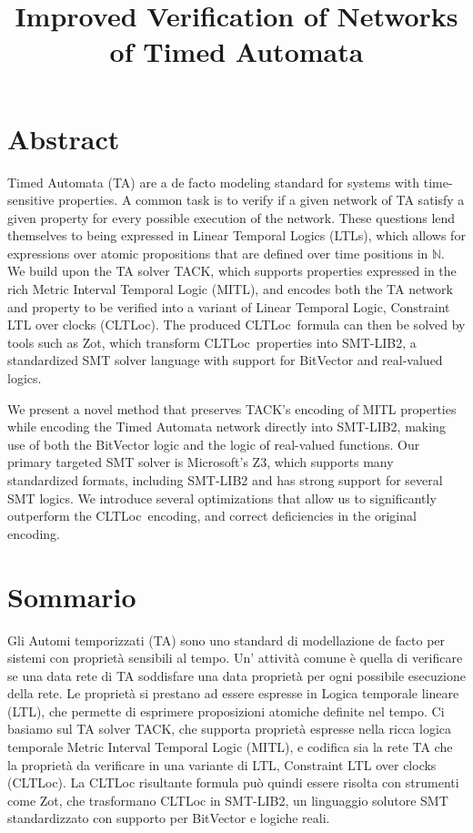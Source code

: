 \documentclass[a4paper,11pt]{report}
\theoremstyle{definition}
\newcommand{\cltloc}{CLTLoc}
\begin{document}
\title{Improved Verification of Networks of Timed Automata}
  

\tableofcontents
\listoffigures
\newpage
\listoftables
\newpage

\clearpage
\section*{Abstract}\label{abstract}

Timed Automata (TA) are a de facto modeling standard for systems with
time-sensitive properties. A common task is to verify if a given network of TA
satisfy a given property for every possible execution of the network. These
questions lend themselves to being expressed in Linear Temporal Logics (LTLs),
which allows for expressions over atomic propositions that are defined over time
positions in $\mathbb{N}$. We build upon the TA solver TACK, which supports
properties expressed in the rich Metric Interval Temporal Logic (MITL), and
encodes both the TA network and property to be verified into a variant of Linear
Temporal Logic, Constraint LTL over clocks (\cltloc). The produced \cltloc\
formula can then be solved by tools such as Zot, which transform \cltloc\
properties into SMT-LIB2, a standardized SMT solver language with support for
BitVector and real-valued logics.

We present a novel method that preserves TACK's encoding of MITL properties
while encoding the Timed Automata network directly into SMT-LIB2, making use of
both the BitVector logic and the logic of real-valued functions. Our primary
targeted SMT solver is Microsoft's Z3, which supports many standardized formats,
including SMT-LIB2 and has strong support for several SMT logics. We introduce
several optimizations that allow us to significantly outperform the \cltloc\
encoding, and correct deficiencies in the original encoding.

\section*{Sommario}\label{sommario}
\addcontentsline{toc}{section}{Sommario}

Gli Automi temporizzati (TA) sono uno standard di modellazione de facto per
sistemi con proprietà sensibili al tempo. Un' attività comune è quella di
verificare se una data rete di TA soddisfare una data proprietà per ogni
possibile esecuzione della rete. Le proprietà si prestano ad essere espresse in
Logica temporale lineare (LTL), che permette di esprimere proposizioni atomiche
definite nel tempo. Ci basiamo sul TA solver TACK, che supporta proprietà
espresse nella ricca logica temporale Metric Interval Temporal Logic (MITL), e
codifica sia la rete TA che la proprietà da verificare in una variante di LTL,
Constraint LTL over clocks (CLTLoc). La CLTLoc risultante formula può quindi
essere risolta con strumenti come Zot, che trasformano CLTLoc in SMT-LIB2, un
linguaggio solutore SMT standardizzato con supporto per BitVector e logiche
reali.
\end{document}
